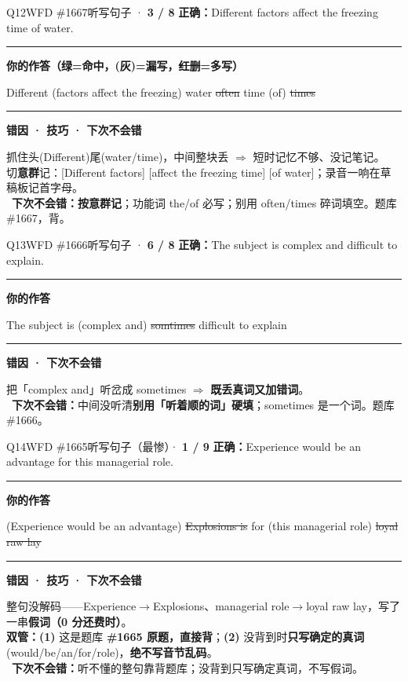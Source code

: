 \documentclass[11pt]{article}
\newcommand{\yes}{{\color{cFix}\ding{51}}}
\newcommand{\ptesub}[1]{%
  \par\needspace{2\baselineskip}\smallskip
  {\color{cAccent}\rule[-0.2ex]{3pt}{1.05em}}\hspace{6pt}%
  {\bfseries\color{cHead}#1}\par\nopagebreak\smallskip}
\newcommand{\zh}[1]{{\footnotesize\textcolor{cNote}{\textbf{译}}\ \textcolor{gray}{#1}}}
\newcommand{\lhit}[1]{{\color{cFix}#1}}
\newcommand{\lmiss}[1]{{\color{cWrong}\sout{#1}}}
\begin{document}
\begin{qblock}{Q12\quad WFD \#1667}{听写句子 · \textcolor{cWrong}{\bfseries 3 / 8}}
\textbf{正确：}Different factors affect the freezing time of water.\quad\zh{不同的因素会影响水的结冰时间。}
\ptesub{你的作答（\lhit{绿}=命中，{\color{gray}(灰)}=漏写，\lmiss{红删}=多写）}
{\small\lhit{Different} {\color{gray}(factors affect the freezing)} \lhit{water} \lmiss{often} \lhit{time} {\color{gray}(of)} \lmiss{times}}
\ptesub{错因 · 技巧 · 下次不会错}
\begin{notebox}\small
抓住头(Different)尾(water/time)，中间整块丢 $\Rightarrow$ 短时记忆不够、没记笔记。\\
切\textbf{意群}记：[Different factors] [affect the freezing time] [of water]；录音一响在草稿板记首字母。\\
\yes\ \textbf{下次不会错：}\textbf{按意群记}；功能词 the/of 必写；别用 often/times 碎词填空。\quad 题库 \#1667，背。
\end{notebox}
\end{qblock}

\begin{qblock}{Q13\quad WFD \#1666}{听写句子 · \textcolor{cPartial}{\bfseries 6 / 8}}
\textbf{正确：}The subject is complex and difficult to explain.\quad\zh{这个主题复杂且难以解释。}
\ptesub{你的作答}
{\small\lhit{The subject is} {\color{gray}(complex and)} \lmiss{somtimes} \lhit{difficult to explain}}
\ptesub{错因 · 下次不会错}
\begin{notebox}\small
把「complex and」听岔成 sometimes $\Rightarrow$ \textbf{既丢真词又加错词}。\\
\yes\ \textbf{下次不会错：}中间没听清\textbf{别用「听着顺的词」硬填}；sometimes 是一个词。\quad 题库 \#1666。
\end{notebox}
\end{qblock}

\begin{qblock}{Q14\quad WFD \#1665}{听写句子（最惨）· \textcolor{cWrong}{\bfseries 1 / 9}}
\textbf{正确：}Experience would be an advantage for this managerial role.\quad\zh{经验对这个管理职位将是一项优势。}
\ptesub{你的作答}
{\small {\color{gray}(Experience would be an advantage)} \lmiss{Explosions is} \lhit{for} {\color{gray}(this managerial role)} \lmiss{loyal raw lay}}
\ptesub{错因 · 技巧 · 下次不会错}
\begin{notebox}\small
整句没解码——Experience$\to$Explosions、managerial role$\to$loyal raw lay，写了一串\textbf{假词（0 分还费时）}。\\
\textbf{双管：}\textbf{(1)} 这是题库 \textbf{\#1665 原题，直接背}；\textbf{(2)} 没背到时\textbf{只写确定的真词}(would/be/an/for/role)，\textbf{绝不写音节乱码}。\\
\yes\ \textbf{下次不会错：}听不懂的整句靠背题库；没背到只写确定真词，不写假词。
\end{notebox}
\end{qblock}
\end{document}
